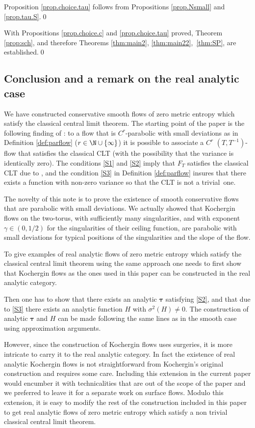 \documentclass[JEP,XML,SOM,Unicode,NoFloatCountersInSection]{cedram}
\newcommand\btau{{\boldsymbol{\tau}}}
\theoremstyle{definition}
\theoremstyle{plain}
\begin{document}
Proposition \ref{prop.choice.tau}
follows from Propositions \ref{prop.Nsmall} and
\ref{prop.tau.S}.\qed

\smallskip
With Propositions \ref{prop.choice.c} and
\ref{prop.choice.tau} proved, Theorem \ref{prop:sch}, and therefore Theorems \ref{thm:main2}, \ref{thm:main22},~\ref{thm:SP}, are established.\qed

\subsection*{Conclusion and a remark on the real analytic case}

We have constructed conservative smooth flows of zero
metric entropy which satisfy the classical central limit theorem. The starting point of the paper is the following finding of \cite{DDKN}: to a flow that is $C^r$-parabolic with small deviations as in Definition \ref{def:parflow} ($r\in \N \cup \{\infty\}$) it is possible to associate a $C^r$ $(T,T^{-1})$-flow that satisfies the classical CLT (with the possibility that the variance is identically zero). The conditions \eqref{S1} and \eqref{S2} imply that $F_T$ satisfies the classical CLT due to
\cite[Th.\,3.2]{DDKN}, and
the condition \eqref{S3} in Definition \ref{def:parflow} insures that there exists a function with non-zero variance so that the CLT is not a trivial~one.

The novelty of this note is to prove the existence of smooth conservative flows that are parabolic with small deviations. We actually showed that Kochergin flows on the two-torus, with sufficiently many singularities, and with exponent $\gamma\in (0,1/2)$ for the singularities of their ceiling function, are parabolic with small deviations for typical positions of the singularities and the slope of the flow.

To give examples of real analytic flows of zero
metric entropy which satisfy the classical central limit theorem using the same approach one needs to first show that Kochergin flows as the ones used in this paper can be constructed in the real analytic category.

Then one has to show that there exists an analytic $\btau$ satisfying \eqref{S2}, and that due to \eqref{S3} there exists an analytic function $H$ with $\sigma^2(H)\neq 0$.
The construction of analytic $\btau$ and $H$ can be made following the same lines as in the smooth case using approximation arguments.

However, since the construction of Kochergin flows uses surgeries, it is more intricate to carry it to the real analytic category. In fact the existence of real analytic Kochergin flows is not straightforward from Kochergin's original construction and requires some care. Including this extension in the current paper would encumber it with technicalities that are out of the scope of the paper and we preferred to leave it for a separate work on surface flows. Modulo this extension, it is easy to modify the rest of the construction included in this paper to get real analytic flows of zero
metric entropy which satisfy a non trivial classical central limit
theorem.
\end{document}
